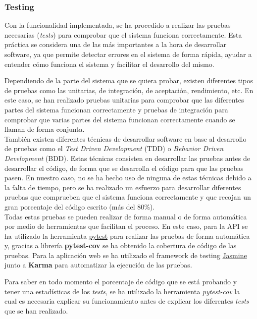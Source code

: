 \newpage

\subsubsection{Testing}\label{subsubsec:testing}

Con la funcionalidad implementada, se ha procedido a realizar las pruebas necesarias (\textit{tests}) para comprobar que el sistema funciona correctamente.
Esta práctica se considera una de las más importantes a la hora de desarrollar software, ya que permite detectar errores en el sistema de forma
rápida, ayudar a entender cómo funciona el sistema y facilitar el desarrollo del mismo.

Dependiendo de la parte del sistema que se quiera probar, existen diferentes tipos de pruebas como las unitarias, de integración,
de aceptación, rendimiento, etc. En este caso, se han realizado pruebas unitarias para comprobar que las diferentes
partes del sistema funcionan correctamente y pruebas de integración para comprobar que varias partes del sistema funcionan correctamente
cuando se llaman de forma conjunta. \\

También existen diferentes técnicas de desarrollar software en base al desarrollo de pruebas como el \textit{Test Driven Development} (TDD) o
\textit{Behavior Driven Development} (BDD). Estas técnicas consisten en desarrollar las pruebas antes de desarrollar el código, de forma que
se desarrolla el código para que las pruebas pasen. En nuestro caso, no se ha hecho uso de ninguna de estas técnicas debido a la falta de tiempo, pero
se ha realizado un esfuerzo para desarrollar diferentes pruebas que comprueben que el sistema funciona correctamente y que
recojan un gran porcentaje del código escrito (más del 80\%). \\

Todas estas pruebas se pueden realizar de forma manual o de forma automática por medio de herramientas que facilitan el proceso.
En este caso, para la API se ha utilizado la herramienta \href{https://pytest.org/}{pytest} para realizar las pruebas de forma automática y,
gracias a librería \textbf{pytest-cov} se ha obtenido la cobertura de código de las pruebas. Para la aplicación web se ha utilizado el framework
de testing \href{https://jasmine.github.io/}{Jasmine} junto a \textbf{Karma} para automatizar la ejecución de las pruebas.

Para saber en todo momento el porcentaje de código que se está probando
y tener una estadísticas de los \textit{tests}, se ha utilizado la herramienta \textit{pytest-cov} la cual es necesaria
explicar su funcionamiento antes de explicar los diferentes \textit{tests} que se han realizado. \\

